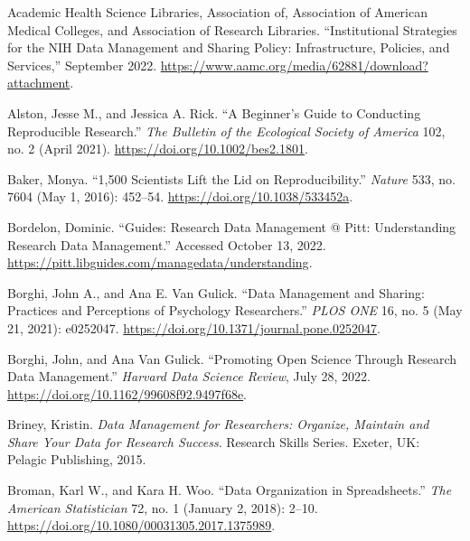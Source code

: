 \documentclass[
]{book}
\newlength{\cslhangindent}
\newlength{\cslentryspacingunit} %
\newenvironment{CSLReferences}[2] %
 {%
  \setlength{\parindent}{0pt}
  \ifodd #1
  \let\oldpar\par
  \def\par{\hangindent=\cslhangindent\oldpar}
  \fi
  \setlength{\parskip}{#2\cslentryspacingunit}
 }%
 {}
\begin{document}
\hypertarget{refs}{}
\begin{CSLReferences}{1}{0}
\leavevmode{}%
Academic Health Science Libraries, Association of, Association of American Medical Colleges, and Association of Research Libraries. {``Institutional Strategies for the {NIH} Data Management and Sharing Policy: Infrastructure, Policies, and Services,''} September 2022. \url{https://www.aamc.org/media/62881/download?attachment}.

\leavevmode{}%
Alston, Jesse M., and Jessica A. Rick. {``A Beginner's Guide to Conducting Reproducible Research.''} \emph{The Bulletin of the Ecological Society of America} 102, no. 2 (April 2021). \url{https://doi.org/10.1002/bes2.1801}.

\leavevmode{}%
Baker, Monya. {``1,500 Scientists Lift the Lid on Reproducibility.''} \emph{Nature} 533, no. 7604 (May 1, 2016): 452--54. \url{https://doi.org/10.1038/533452a}.

\leavevmode{}%
Bordelon, Dominic. {``Guides: Research Data Management @ Pitt: Understanding Research Data Management.''} Accessed October 13, 2022. \url{https://pitt.libguides.com/managedata/understanding}.

\leavevmode{}%
Borghi, John A., and Ana E. Van Gulick. {``Data Management and Sharing: Practices and Perceptions of Psychology Researchers.''} \emph{{PLOS} {ONE}} 16, no. 5 (May 21, 2021): e0252047. \url{https://doi.org/10.1371/journal.pone.0252047}.

\leavevmode{}%
Borghi, John, and Ana Van Gulick. {``Promoting Open Science Through Research Data Management.''} \emph{Harvard Data Science Review}, July 28, 2022. \url{https://doi.org/10.1162/99608f92.9497f68e}.

\leavevmode{}%
Briney, Kristin. \emph{Data Management for Researchers: Organize, Maintain and Share Your Data for Research Success}. Research Skills Series. Exeter, {UK}: Pelagic Publishing, 2015.

\leavevmode{}%
Broman, Karl W., and Kara H. Woo. {``Data Organization in Spreadsheets.''} \emph{The American Statistician} 72, no. 1 (January 2, 2018): 2--10. \url{https://doi.org/10.1080/00031305.2017.1375989}.


\end{CSLReferences}
\end{document}
